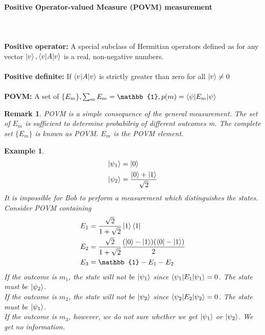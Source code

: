 \documentclass[]{article}
\newtheorem*{remark}{Remark}
\newtheorem*{example}{Example}
\theoremstyle{nonumberplain}
\begin{document}
\paragraph{Positive Operator-valued Measure (POVM) measurement}%
\label{par:paragraph_name}
\ \\
\\
\textbf{Positive operator:} A special subclass of Hermitian operators defined as for any vector $\ket{v}, \braket{v|A|v}$ is a real, non-negative numbers.\\
\\
\textbf{Positive definite:} If $\braket{v|A|v}$ is strictly greater than zero for all $\ket{v}\neq 0$\\
\\
\textbf{POVM:} A set of $\{E_{m}\}, \sum^{}_{m} E_{m}=\mathbb{1}, p(m)=\braket{\psi|E_{m}|\psi}$
\begin{remark}
	POVM is a simple consequence of the general measurement. The set of $E_{m}$ is sufficient to determine probabilriy of different outcomes m. The complete set $\{E_{m}\}$ is known as POVM. $E_{m}$ is the POVM element.
\end{remark}
\begin{example}
\begin{equation*}
\begin{aligned}
	\ket{{\psi_{1}}}&=\ket{0}\\
	\ket{\psi_{2}}&=\frac{\ket{0}+\ket{1}}{\sqrt{2}}
\end{aligned}
\end{equation*}
It is impossible for Bob to perform a measurement which distinguishes the states. \\
Consider POVM containing 
\begin{equation*}
\begin{aligned}
	E_{1}&=\frac{\sqrt{2}}{1+\sqrt{2}}\ket{1}\bra{1}\\
	E_{2}&=\frac{\sqrt{2}}{1+\sqrt{2}}\frac{(\ket{0}-\ket{1})(\bra{0}-\ket{1})}{2}\\
	E_{3}&=\mathbb{1}-E_{1}-E_{2}
\end{aligned}
\end{equation*}
If the outcome is $m_{1}$, the state will not be $\ket{\psi_{1}}$ since $\braket{\psi_{1}|E_{1}|\psi_{1}}=0$. The state must be $\ket{\psi_{2}}$.\\
If the outcome is $m_{2}$, the state will not be $\ket{\psi_{2}}$ since $\braket{\psi_{2}|E_{2}|\psi_{2}}=0$. The state must be $\ket{\psi_{1}}$.\\
If the outcome is $m_{3}$, however, we do not sure whether we get $\ket{\psi_{1}}$ or $\ket{\psi_{2}}$. We get no information.
\end{example}
\end{document}
